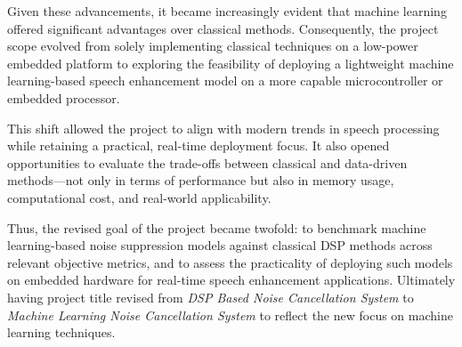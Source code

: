 Given these advancements, it became increasingly evident that machine learning offered significant advantages over classical methods. Consequently, the project scope evolved from solely implementing classical techniques on a low-power embedded platform to exploring the feasibility of deploying a lightweight machine learning-based speech enhancement model on a more capable microcontroller or embedded processor.

This shift allowed the project to align with modern trends in speech processing while retaining a practical, real-time deployment focus. It also opened opportunities to evaluate the trade-offs between classical and data-driven methods—not only in terms of performance but also in memory usage, computational cost, and real-world applicability.

Thus, the revised goal of the project became twofold: to benchmark machine learning-based noise suppression models against classical DSP methods across relevant objective metrics, and to assess the practicality of deploying such models on embedded hardware for real-time speech enhancement applications. Ultimately having project title revised from \textit{DSP Based Noise Cancellation System} to \textit{Machine Learning Noise Cancellation System} to reflect the new focus on machine learning techniques.
